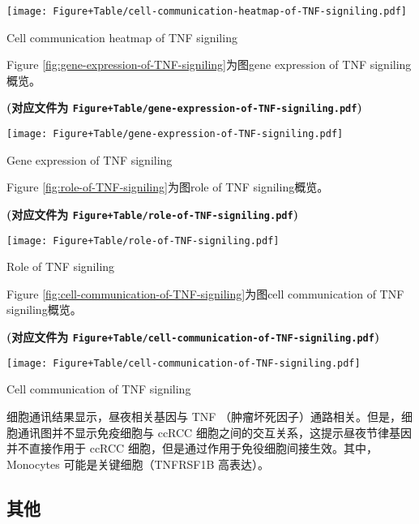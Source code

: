 \documentclass[
]{article}
\begin{document}
\def\@captype{figure}
\begin{center}
\texttt{[image: Figure+Table/cell-communication-heatmap-of-TNF-signiling.pdf]}
\caption{Cell communication heatmap of TNF signiling}\label{fig:cell-communication-heatmap-of-TNF-signiling}
\end{center}

Figure \ref{fig:gene-expression-of-TNF-signiling}为图gene expression of TNF signiling概览。

\textbf{(对应文件为 \texttt{Figure+Table/gene-expression-of-TNF-signiling.pdf})}

\def\@captype{figure}
\begin{center}
\texttt{[image: Figure+Table/gene-expression-of-TNF-signiling.pdf]}
\caption{Gene expression of TNF signiling}\label{fig:gene-expression-of-TNF-signiling}
\end{center}

Figure \ref{fig:role-of-TNF-signiling}为图role of TNF signiling概览。

\textbf{(对应文件为 \texttt{Figure+Table/role-of-TNF-signiling.pdf})}

\def\@captype{figure}
\begin{center}
\texttt{[image: Figure+Table/role-of-TNF-signiling.pdf]}
\caption{Role of TNF signiling}\label{fig:role-of-TNF-signiling}
\end{center}

Figure \ref{fig:cell-communication-of-TNF-signiling}为图cell communication of TNF signiling概览。

\textbf{(对应文件为 \texttt{Figure+Table/cell-communication-of-TNF-signiling.pdf})}

\def\@captype{figure}
\begin{center}
\texttt{[image: Figure+Table/cell-communication-of-TNF-signiling.pdf]}
\caption{Cell communication of TNF signiling}\label{fig:cell-communication-of-TNF-signiling}
\end{center}

细胞通讯结果显示，昼夜相关基因与 TNF （肿瘤坏死因子）通路相关。但是，细胞通讯图并不显示免疫细胞与 ccRCC 细胞之间的交互关系，这提示昼夜节律基因并不直接作用于 ccRCC 细胞，但是通过作用于免役细胞间接生效。其中，Monocytes 可能是关键细胞（TNFRSF1B 高表达）。

\hypertarget{ux5176ux4ed6}{%
\subsection{其他}\label{ux5176ux4ed6}}
\end{document}
